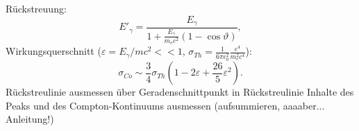 Rückstreuung:
\begin{equation}
    {E'}_{\!\gamma} = \frac{E_\gamma}{1 + \frac{E_\gamma}{m_e c^2} \left(1 - \cos\vartheta \right)},
    \label{eq:rückstreu}
\end{equation}
Wirkungsquerschnitt ($\varepsilon = E_\gamma / m c^2 << 1$, $\sigma_{Th} = \frac{1}{6 \pi \epsilon_0^2} \frac{e^4}{m_{e}^2 c^4}$):
\begin{equation}
    \sigma_{Co} \sim \frac{3}{4}\sigma_{Th} \left(1 - 2\varepsilon + \frac{26}{5}\varepsilon^2 \right).
\end{equation}
%
	Rückstreulinie ausmessen
	über Geradenschnittpunkt in Rückstreulinie
	Inhalte des Peaks und des Compton-Kontinuums ausmessen (aufsummieren, aaaaber... Anleitung!)
